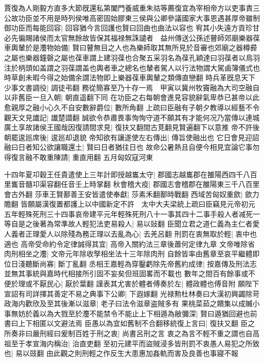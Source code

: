 賈復為人剛毅方直多大節旣還私第闔門養威重朱祜等薦復宜為宰相帝方以吏事責三公故功臣並不用是時列侯唯高密固始膠東三侯與公卿參議國家大事恩遇甚厚帝雖制御功臣而每能回容|{
	回容猶今言回護也賢曰回曲也曲法以容也}
宥其小失遠方貢珍甘必先徧賜諸侯而太官無餘故皆保其福禄無誅譴者　益州傳送公孫述瞽師郊廟樂器葆車輿輦於是灋物始備|{
	賢曰瞽無目之人也為樂師取其無所見於音審也郊廟之器樽彛之屬也樂器鐘磬之屬也葆車謂上建羽葆也合聚五采羽名為葆孔穎達曰羽葆者以鳥羽注於柄頭如盖謂之羽葆謂盖也輿者車之總名也輦者駕人以行法物謂大駕鹵簿儀式也時草創未暇今得之始備余謂法物即上樂器葆車輿輦之類傳直戀翻}
時兵革旣息天下少事文書調役|{
	調徒弔翻}
務從簡寡至乃十存一焉　甲寅以冀州牧竇融為大司空融自以非舊臣一旦入朝|{
	朝直遥翻下同}
在功臣之右每朝會進見容貌辭氣卑恭已甚帝以此愈親厚之融小心久不自安數辭爵位|{
	數所角翻}
上疏曰臣融有子朝夕教導以經藝不令觀天文見䜟記|{
	䜟楚譛翻}
誠欲令恭肅畏事恂恂守道不願其有才能何况乃當傳以連城廣土享故諸侯王國哉因復請間求見|{
	復扶又翻間古莧翻見賢遍翻下以意推}
帝不許後朝罷逡廵席後|{
	逡廵却退貌}
帝知欲有讓遂使左右傳出|{
	傳旨使融出也}
它日會見迎詔融曰日者知公欲讓職還土|{
	賢曰日者猶往日也}
故命公暑熱且自便今相見宜論它事勿得復言融不敢重陳請|{
	重直用翻}
五月匈奴寇河東

十四年夏卭穀王任貴遣使上三年計即授越巂太守|{
	郡國志越巂郡在雒陽西四千八百里巂音髓卭渠容翻任音壬上時掌翻}
秋會稽大疫|{
	郡國志會稽郡在雒陽東三千八百里會古外翻}
莎車王賢鄯善王安皆遣使奉獻|{
	莎素禾翻鄯時戰翻}
西域苦匈奴重歛|{
	歛力贍翻}
皆願屬漢復置都護上以中國新定不許　太中大夫梁統上疏曰臣竊見元帝初元五年輕殊死刑三十四事哀帝建平元年輕殊死刑八十一事其四十二事手殺人者减死一等自是之後著為常準故人輕犯法吏易殺人|{
	易以䜴翻}
臣聞立君之道仁義為主仁者愛人義者正理愛人以除殘為務正理以去亂為心|{
	去羌呂翻}
刑罰在衷無取於輕|{
	衷中也適也}
高帝受命約令定律誠得其宜|{
	高帝入關約法三章後蕭何定律九章}
文帝唯除省肉刑相坐之灋|{
	文帝元年除收孥相坐法十三年除肉刑}
自餘皆率由舊章至哀平繼體即位日淺聽斷尚寡|{
	斷丁亂翻}
丞相王嘉輕為穿鑿虧除先帝舊約成律|{
	按嘉傳及刑法志並無其事統與嘉時代相接所引固不妄矣但班固畧而不載也}
數年之間百有餘事或不便於理或不厭民心|{
	厭於葉翻}
謹表其尤害於體者傅奏於左|{
	體政體也傅音附}
願陛下宣詔有司詳擇其善定不易之典事下公卿|{
	下遐嫁翻}
光禄勲杜林奏曰大漢初興蠲除苛政海内歡欣及至其後漸以滋章|{
	老子曰法令滋章盗賊多有}
果桃菜茹之饋集以成贓小事無妨於義以為大戮至於灋不能禁令不能止上下相遁為敝彌深|{
	賢曰遁猶回避也前書曰上下相匿以文避法焉}
臣愚以為宜如舊制不合翻移統復上言曰|{
	復扶又翻}
臣之所奏非曰嚴刑經曰爰制百姓于刑之衷|{
	尚書呂刑之言}
衷之為言不輕不重之謂也自高祖至于孝宣海内稱治|{
	治直吏翻}
至初元建平而盜賊浸多皆刑罰不衷愚人易犯之所致也|{
	易以豉翻}
由此觀之則刑輕之作反生大患惠加姦軌而害及良善也事寢不報

